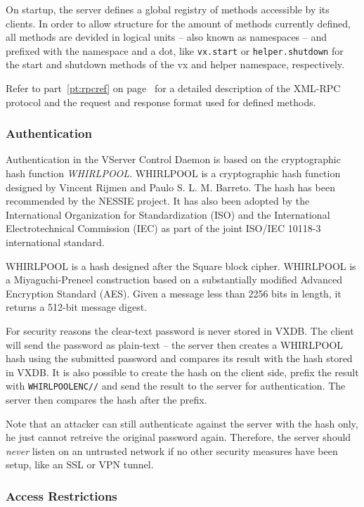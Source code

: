 On startup, the server defines a global registry of methods accessible by its
clients. In order to allow structure for the amount of methods currently
defined, all methods are devided in logical units -- also known as namespaces --
and prefixed with the namespace and a dot, like \verb,vx.start, or
\verb,helper.shutdown, for the start and shutdown methods of the vx and helper
namespace, respectively.

Refer to part~\ref{pt:rpcref} on page~\pageref{pt:rpcref} for a detailed
description of the XML-RPC protocol and the request and response format used
for defined methods.

\subsubsection{Authentication}

Authentication in the VServer Control Daemon is based on the cryptographic hash
function \emph{WHIRLPOOL}. WHIRLPOOL is a cryptographic hash function designed
by Vincent Rijmen and Paulo S. L. M. Barreto. The hash has been recommended by
the NESSIE project. It has also been adopted by the International Organization
for Standardization (ISO) and the International Electrotechnical Commission
(IEC) as part of the joint ISO/IEC 10118-3 international standard.

WHIRLPOOL is a hash designed after the Square block cipher. WHIRLPOOL is a
Miyaguchi-Preneel construction based on a substantially modified Advanced
Encryption Standard (AES).  Given a message less than 2256 bits in length, it
returns a 512-bit message digest.

For security reasons the clear-text password is never stored in VXDB. The
client will send the password as plain-text -- the server then creates a
WHIRLPOOL hash using the submitted password and compares its result with the
hash stored in VXDB. It is also possible to create the hash on the client side,
prefix the result with \verb,WHIRLPOOLENC//, and send the result to the server
for authentication. The server then compares the hash after the prefix.

Note that an attacker can still authenticate against the server with the hash
only, he just cannot retreive the original password again. Therefore, the server
should \emph{never} listen on an untrusted network if no other security measures
have been setup, like an SSL or VPN tunnel.


\subsubsection{Access Restrictions}

